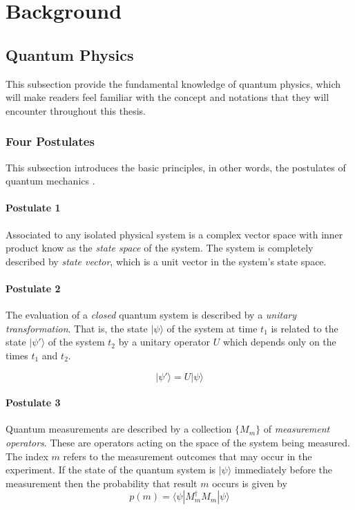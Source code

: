 \chapter{Background}
\label{background}

\section{Quantum Physics}

This subsection provide the fundamental knowledge of quantum physics, which will make readers feel familiar with the concept and notations that they will encounter throughout this thesis.

\subsection{Four Postulates}

This subsection introduces the basic principles, in other words, the postulates of quantum mechanics \cite{10.5555/1972505}.

\subsubsection{Postulate 1}

Associated to any isolated physical system is a complex vector space with inner product know as the \textit{state space} of the system.
The system is completely described by \textit{state vector}, which is a unit vector in the system's state space.

\subsubsection{Postulate 2}

The evaluation of a \textit{closed} quantum system is described by a \textit{unitary transformation}.
That is, the state $|\psi\rangle$ of the system at time $t_1$ is related to the state $|\psi'\rangle$ of the system $t_2$ by a unitary operator $U$ which depends only on the times $t_1$ and $t_2$.

$$ |\psi'\rangle = U|\psi\rangle$$

\subsubsection{Postulate 3}

Quantum measurements are described by a collection $\{M_m\}$ of \textit{measurement operators}.
These are operators acting on the space of the system being measured. The index $m$ refers to the measurement outcomes that may occur in the experiment.
If the state of the quantum system is $|\psi\rangle$ immediately before the measurement then the probability that result $m$ occurs is given by 
$$ p(m) = \langle \psi |M^{\dagger}_m M_m | \psi \rangle $$

